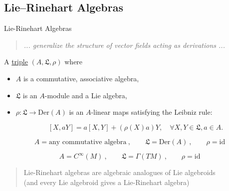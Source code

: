 \documentclass[beamer,10pt]{standalone}
\begin{document}
\checkpoint


\subsection{Lie--Rinehart Algebras}

\begin{frame}{Lie-Rinehart Algebras}
  
  \begin{quote}
    \centering
    \emph{... generalize the structure of vector fields acting as derivations ...}
  \end{quote}
 
  \begin{defblock}
    A \underline{triple} $(A,\mathfrak{L},\rho)$ where
    \begin{itemize}[label=$\triangleright$]
      \item $A$ is a commutative, associative algebra,
      \item $\mathfrak{L}$ is an $A$-module and a Lie algebra,
      \item $\rho: \mathfrak{L} \to \mathrm{Der}(A)$ is an $A$-linear maps satisfying the Leibniz rule:
      
      \vspace{-.5em}
        $$
          [X, aY] = a[X,Y] + (\rho(X)a)Y, \quad \forall X,Y \in \mathfrak{L}, a \in A.
        $$
    \end{itemize}

  \end{defblock}  
  \pause\vfill

  \begin{exblock}[Derivations]
    $$
      A=\text{any commutative algebra}~, \qquad \mathfrak{L}=\mathrm{Der}(A)~,\qquad \rho=\mathrm{id}
    $$ 
  \end{exblock}
  \pause\vfill

  \begin{exblock}
    $$
      A=C^\infty(M)~,  \qquad \mathfrak{L}=\Gamma(TM)~,\qquad \rho=\mathrm{id}
    $$ 
    \begin{quotation}
      \centering
      Lie-Rinehart algebras are algebraic analogues of Lie algebroids
      \\
      (and every Lie algebroid gives a Lie-Rinehart algebra)
    \end{quotation} 
  \end{exblock}
  \vfill

\end{frame}
\end{document}

